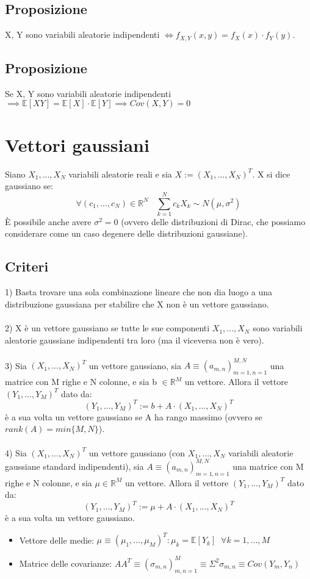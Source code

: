 \documentclass{article}
\begin{document}
\subsection*{Proposizione}
X, Y sono variabili aleatorie indipendenti $\iff f_{X,Y}(x,y) = f_{X}(x)\cdot f_{Y}(y)$.

\subsection*{Proposizione}
Se X, Y sono variabili aleatorie indipendenti $\implies \mathbb{E}[XY] =  \mathbb{E}[X]\cdot  \mathbb{E}[Y] \implies Cov(X,Y) = 0$

\section*{Vettori gaussiani}
Siano $X_{1},...,X_{N}$ variabili aleatorie reali e sia $X := (X_{1},...,X_{N})^{T}$. X si dice gaussiano se:
\[ \forall (c_{1},...,c_{N}) \in \mathbb{R}^{N} \; \; \; \sum_{k=1}^{N} c_{k}X_{k} \sim N(\mu,\sigma^{2}) \]
\`E possibile anche avere $\sigma^{2} = 0$ (ovvero delle distribuzioni di Dirac, che possiamo considerare come un caso degenere delle distribuzioni gaussiane).

 \subsection*{Criteri}
1) Basta trovare una sola combinazione lineare che non dia luogo a una distribuzione gaussiana per stabilire che X non è un vettore gaussiano.\\
\\
2) X è un vettore gaussiano se tutte le sue componenti $X_{1},...,X_{N}$ sono variabili aleatorie gaussiane indipendenti tra loro (ma il viceversa non è vero).\\
\\
3) Sia $(X_{1},...,X_{N})^{T}$ un vettore gaussiano, sia $A \equiv (a_{m,n})_{m=1,n=1}^{M,N}$ una matrice con M righe e N colonne, e sia b $\in \mathbb{R}^{M}$ un vettore. Allora il vettore $(Y_{1},...,Y_{M})^{T}$ dato da:
\[ (Y_{1},...,Y_{M})^{T} := b+A\cdot (X_{1},...,X_{N})^{T} \]
 è a sua volta un vettore gaussiano se A ha rango massimo (ovvero se $rank(A) = min\{M,N\}$).\\
\\
4) Sia $(X_{1},...,X_{N})^{T}$ un vettore gaussiano (con $X_{1},...,X_{N}$ variabili aleatorie gaussiane standard indipendenti), sia $A \equiv (a_{m,n})_{m=1,n=1}^{M,N}$ una matrice con M righe e N colonne, e sia $\mu \in \mathbb{R}^{M}$ un vettore. Allora il vettore $(Y_{1},...,Y_{M})^{T}$ dato da:
\[ (Y_{1},...,Y_{M})^{T} := \mu+A\cdot (X_{1},...,X_{N})^{T} \]
 è a sua volta un vettore gaussiano.
\begin{itemize}
\item Vettore delle medie: $\mu \equiv (\mu_{1},...,\mu_{M})^{T}: \mu_{k} = \mathbb{E}[Y_{k}] \; \; \forall k = 1,...,M$
\item Matrice delle covarianze: $AA^{T} \equiv (\sigma_{m,n})_{m,n=1}^{M} \equiv \Sigma^{2}\sigma_{m,n} \equiv Cov(Y_{m},Y_{n})$
\end{itemize}
\end{document}
